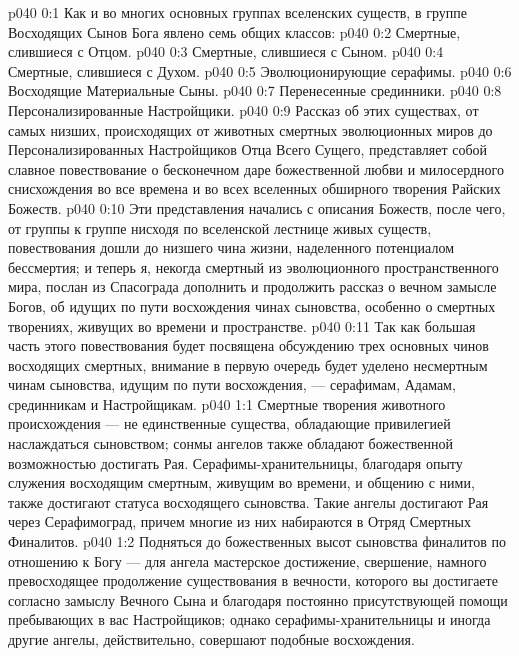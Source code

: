 \author{Могучий Вестник}
\vs p040 0:1 Как и во многих основных группах вселенских существ, в группе Восходящих Сынов Бога явлено семь общих классов:
\vs p040 0:2 \bibnobreakspace Смертные, слившиеся с Отцом.
\vs p040 0:3 \bibnobreakspace Смертные, слившиеся с Сыном.
\vs p040 0:4 \bibnobreakspace Смертные, слившиеся с Духом.
\vs p040 0:5 \bibnobreakspace Эволюционирующие серафимы.
\vs p040 0:6 \bibnobreakspace Восходящие Материальные Сыны.
\vs p040 0:7 \bibnobreakspace Перенесенные срединники.
\vs p040 0:8 \bibnobreakspace Персонализированные Настройщики.
\vs p040 0:9 \pc Рассказ об этих существах, от самых низших, происходящих от животных смертных эволюционных миров до Персонализированных Настройщиков Отца Всего Сущего, представляет собой славное повествование о бесконечном даре божественной любви и милосердного снисхождения во все времена и во всех вселенных обширного творения Райских Божеств.
\vs p040 0:10 Эти представления начались с описания Божеств, после чего, от группы к группе нисходя по вселенской лестнице живых существ, повествования дошли до низшего чина жизни, наделенного потенциалом бессмертия; и теперь я, некогда смертный из эволюционного пространственного мира, послан из Спасограда дополнить и продолжить рассказ о вечном замысле Богов, об идущих по пути восхождения чинах сыновства, особенно о смертных творениях, живущих во времени и пространстве.
\vs p040 0:11 Так как большая часть этого повествования будет посвящена обсуждению трех основных чинов восходящих смертных, внимание в первую очередь будет уделено несмертным чинам сыновства, идущим по пути восхождения, --- серафимам, Адамам, срединникам и Настройщикам.
\vs p040 1:1 Смертные творения животного происхождения --- не единственные существа, обладающие привилегией наслаждаться сыновством; сонмы ангелов также обладают божественной возможностью достигать Рая. Серафимы\hyp{}хранительницы, благодаря опыту служения восходящим смертным, живущим во времени, и общению с ними, также достигают статуса восходящего сыновства. Такие ангелы достигают Рая через Серафимоград, причем многие из них набираются в Отряд Смертных Финалитов.
\vs p040 1:2 Подняться до божественных высот сыновства финалитов по отношению к Богу --- для ангела мастерское достижение, свершение, намного превосходящее продолжение существования в вечности, которого вы достигаете согласно замыслу Вечного Сына и благодаря постоянно присутствующей помощи пребывающих в вас Настройщиков; однако серафимы\hyp{}хранительницы и иногда другие ангелы, действительно, совершают подобные восхождения.
